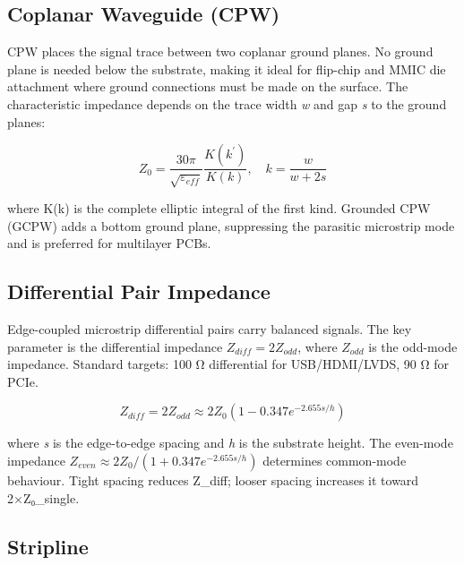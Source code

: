 \subsection{Coplanar Waveguide (CPW)}

      

CPW places the signal trace between two coplanar ground planes. No ground plane is needed below the substrate, making it ideal for flip-chip and MMIC die attachment where ground connections must be made on the surface. The characteristic impedance depends on the trace width \emph{w} and gap \emph{s} to the ground planes:


      
\[Z_0 = \dfrac{30\pi}{\sqrt{\varepsilon_{eff}}}\dfrac{K(k^\prime)}{K(k)}, \quad k = \dfrac{w}{w+2s}\]

      

where K(k) is the complete elliptic integral of the first kind. Grounded CPW (GCPW) adds a bottom ground plane, suppressing the parasitic microstrip mode and is preferred for multilayer PCBs.

      

\subsection{Differential Pair Impedance}

      

Edge-coupled microstrip differential pairs carry balanced signals. The key parameter is the differential impedance $Z_{diff} = 2 Z_{odd}$, where $Z_{odd}$ is the odd-mode impedance. Standard targets: 100 Ω differential for USB/HDMI/LVDS, 90 Ω for PCIe.

      
\[Z_{diff} = 2Z_{odd} \approx 2Z_0\left(1 - 0.347e^{-2.655 s/h}\right)\]

      

where \emph{s} is the edge-to-edge spacing and \emph{h} is the substrate height. The even-mode impedance $Z_{even} \approx 2Z_0/(1 + 0.347e^{-2.655 s/h})$ determines common-mode behaviour. Tight spacing reduces Z\_diff; looser spacing increases it toward 2×Z₀\_single.

      

\subsection{Stripline}

